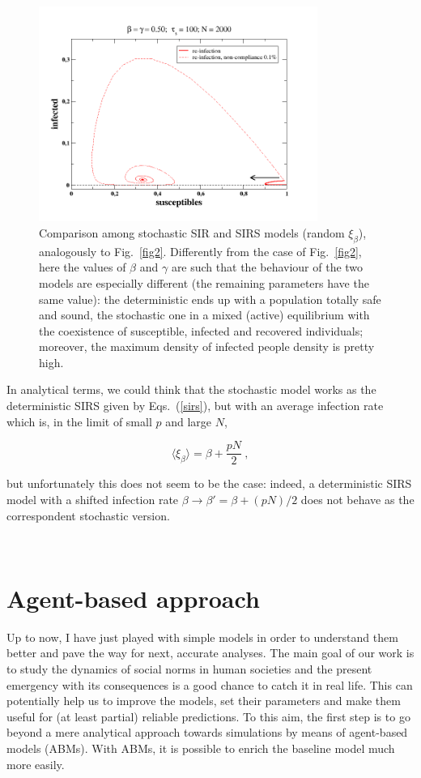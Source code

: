 \documentclass{article}
\begin{document}
\ 

\begin{figure}
  \centering
  \includegraphics[width=91mm]{Fig3.png}
  \caption{Comparison among stochastic SIR and SIRS models (random $\xi_\beta$), analogously to Fig.~\ref{fig2}. Differently from the case of Fig.~\ref{fig2}, here the values of $\beta$ and $\gamma$ are such that the behaviour of the two models are especially different (the remaining parameters have the same value): the deterministic ends up with a population totally safe and sound, the stochastic one in a mixed (active) equilibrium with the coexistence of susceptible, infected and recovered individuals; moreover, the maximum density of infected people density is pretty high.}
  \label{fig3}
\end{figure}

In analytical terms, we could think that the stochastic model works as the deterministic SIRS given by Eqs.~(\ref{sirs}), but with an average infection rate which is, in the limit of small $p$ and large $N$,  

$$
\langle\xi_\beta\rangle = \beta+\frac{pN}{2} \ , 
$$

\noindent but unfortunately this does not seem to be the case: indeed, a deterministic SIRS model with a shifted infection rate $\beta\rightarrow\beta'=\beta+(pN)/2$ does not behave as the correspondent stochastic version.

\ 

\section{Agent-based approach}

Up to now, I have just played with simple models in order to understand them better and pave the way for next, accurate analyses. The main goal of our work is to study the dynamics of social norms in human societies and the present emergency with its consequences is a good chance to catch it in real life. This can potentially help us to improve the models, set their parameters and make them useful for (at least partial) reliable predictions. To this aim, the first step is to go beyond a mere analytical approach towards simulations by means of agent-based models (ABMs). With ABMs, it is possible to enrich the baseline model much more easily.
\end{document}
